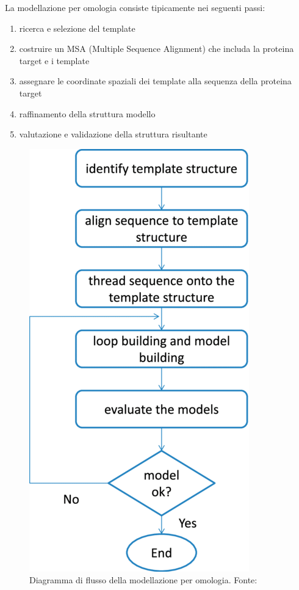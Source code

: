 \par La modellazione per omologia consiste tipicamente nei seguenti passi:
\begin{enumerate}
	\item ricerca e selezione del template
	\item costruire un MSA (Multiple Sequence Alignment) che includa la proteina target e i template
	\item assegnare le coordinate spaziali dei template alla sequenza della proteina target
	\item raffinamento della struttura modello
	\item valutazione e validazione della struttura risultante
\end{enumerate}

\begin{figure}[!htb]
	\includegraphics[scale=0.43]{images/homology1.png}
	\caption{Diagramma di flusso della modellazione per omologia. Fonte: \cite{sliwoski2014computational}}

\end{figure}
